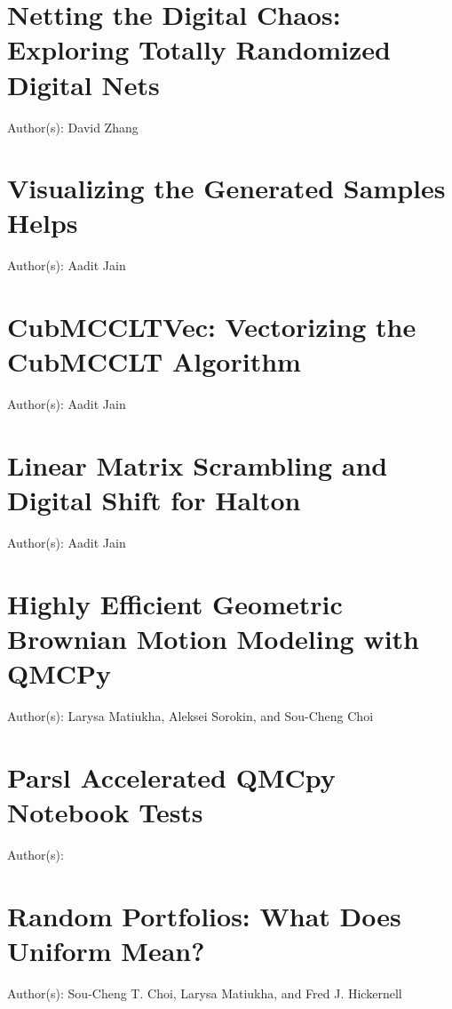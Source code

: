 \documentclass{article}
\newcommand{\blogpost}[5][{}]{\newpage%
\section{#2 {\color{teal}#1}}%
\begin{refsection}%
    \label{#4}%
	Author(s): #3 \newline \newline%
\printbibliography[heading=subbibliography]
\end{refsection}
} %
\theoremstyle{definition}
\begin{document}

 \blogpost{Netting the Digital Chaos: Exploring Totally Randomized Digital Nets}{David Zhang}{}{TotallyRandomDnet/totallyrandomdnet}










\blogpost{Visualizing the Generated Samples Helps}{Aadit Jain}{plotproj}{PlotProjectionsFunction/plotprojectionsfunction}

\blogpost{CubMCCLTVec: Vectorizing the CubMCCLT Algorithm}{Aadit Jain}{cubmccltvec}{CubMCCLTVec/cubmccltvec}

\blogpost{Linear Matrix Scrambling and Digital Shift for Halton}{Aadit Jain}{lms_ds_halton}{LMS_DS_Halton/lms_ds_halton}

\blogpost{Highly Efficient Geometric Brownian Motion Modeling with QMCPy}{Larysa Matiukha, Aleksei Sorokin, and Sou-Cheng Choi}{gbm}{GBM/gbm}

\blogpost{Parsl Accelerated QMCpy Notebook Tests}{\author{Dr. Sou-Cheng Choi (Illinois Tech and SouLab LLC) and Joshua Jay Herman (QMCPy Development Team)}}{parslTestbookQMCblog}{booktests/parslTestbookQMCblog}

\blogpost{Random Portfolios: What Does Uniform Mean?}{Sou-Cheng T. Choi, Larysa Matiukha, and Fred J. Hickernell}{portfoliosimplex}{PortfolioSimplex/portfoliosimplex}
\end{document}
